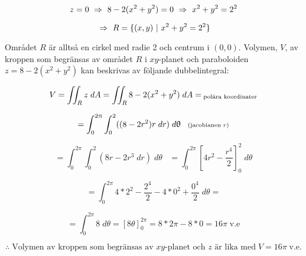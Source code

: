 \documentclass{article}
\begin{document}
$$
z=0 
\Imp 
8-2(x^2+y^2)=0
\Imp
x^2+y^2=2^2
$$

$$
\Imp
R=\{(x, y) \build x^2+y^2=2^2\}
$$

\vskip 0.2cm

Området $R$ är alltså en cirkel med radie 2 och centrum i $(0, 0)$. Volymen, $V$, av kroppen som begränsas av området $R$ i $xy$-planet och paraboloiden $z=8-2(x^2+y^2)$ kan beskrivas av följande dubbelintegral:

\vskip 0.1cm

$$
V=
\iint_{R} z \;dA=
\iint_{R} 8-2(x^2+y^2) \;dA=_{\;\text{\scriptsize polära koordinater}}
$$

$$
=
\int_{0}^{2\pi}\int_{0}^{2}((8-2r^2)r\;dr)\;d\theta \;\;\;\text{\scriptsize(jacobianen $r$)}
$$

$$
=
\int_{0}^{2\pi}\int_{0}^{2}(8r-2r^3\;dr)\;d\theta \;\;\;
=
\int_{0}^{2\pi}\left[4r^2-\frac{r^4}{2}\right]_{0}^{2}\;d\theta
$$

$$
=
\int_{0}^{2\pi}4*2^2-\frac{2^4}{2}-4*0^2+\frac{0^4}{2} \;d\theta
=
$$

$$
=
\int_{0}^{2\pi}8 \;d\theta
=
\left[8\theta\right]_{0}^{2\pi}
=
8*2\pi-8*0
=
16\pi \;\text{v.e}
$$

$$
\therefore\;\text{Volymen av kroppen som begränsas av $xy$-planet och $z$ är lika med}\; V=16\pi\;\text{v.e}.
$$
\end{document}
